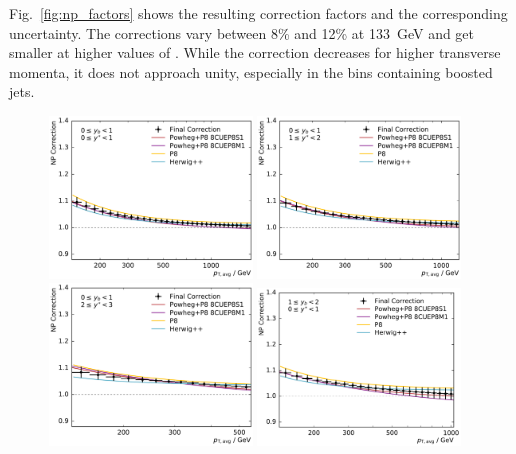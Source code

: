 Fig.~\ref{fig:np_factors} shows the resulting correction factors and the
corresponding uncertainty. The corrections vary between 8\% and 12\% at
\SI{133}{\GeV} and get smaller at higher values of \ptavg. While the correction
decreases for higher transverse momenta, it does not approach unity, especially
in the bins containing boosted jets. 

\begin{figure}[htp]
    \centering
    \includegraphics[width=0.48\textwidth]{figures/theory/np_factors_nlo_final_yb0ys0.pdf}\hfill
    \includegraphics[width=0.48\textwidth]{figures/theory/np_factors_nlo_final_yb0ys1.pdf}
    \includegraphics[width=0.48\textwidth]{figures/theory/np_factors_nlo_final_yb0ys2.pdf}\hfill
    \includegraphics[width=0.48\textwidth]{figures/theory/np_factors_nlo_final_yb1ys0.pdf}

\end{figure}
